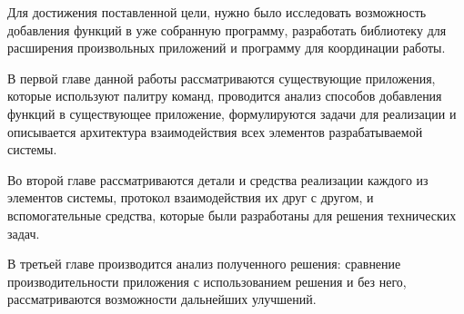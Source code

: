 Для достижения поставленной цели, нужно было исследовать возможность
добавления функций в уже собранную программу, разработать библиотеку для
расширения произвольных приложений и программу для координации работы.

В первой главе данной работы рассматриваются существующие приложения, которые
используют палитру команд, проводится анализ способов добавления функций в
существующее приложение, формулируются задачи для реализации и описывается
архитектура взаимодействия всех элементов разрабатываемой системы.

Во второй главе рассматриваются детали и средства реализации каждого из элементов
системы, протокол взаимодействия их друг с другом, и вспомогательные
средства, которые были разработаны для решения технических задач.

В третьей главе производится анализ полученного решения: сравнение
производительности приложения с использованием решения и без него,
рассматриваются возможности дальнейших улучшений.
